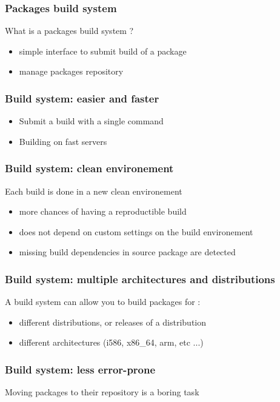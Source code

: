 \documentclass{beamer}
\begin{document}
\begin{frame}
  \frametitle{Packages build system}

  What is a packages build system ?

  \begin{itemize}
    \item simple interface to submit build of a package
    \item manage packages repository
  \end{itemize}
\end{frame}

\begin{frame}
  \frametitle{Build system: easier and faster}

  \begin{itemize}
    \item Submit a build with a single command
    \item Building on fast servers
  \end{itemize}
\end{frame}

\begin{frame}
  \frametitle{Build system: clean environement}

  Each build is done in a new clean environement
  \begin{itemize}
    \item more chances of having a reproductible build
    \item does not depend on custom settings on the build environement
    \item missing build dependencies in source package are detected
  \end{itemize}
\end{frame}

\begin{frame}
  \frametitle{Build system: multiple architectures and distributions}

  A build system can allow you to build packages for :
  \begin{itemize}
    \item different distributions, or releases of a distribution
    \item different architectures (i586, x86\_64, arm, etc ...)
  \end{itemize}
\end{frame}

\begin{frame}
  \frametitle{Build system: less error-prone}

  Moving packages to their repository is a boring task
\end{frame}
\end{document}
